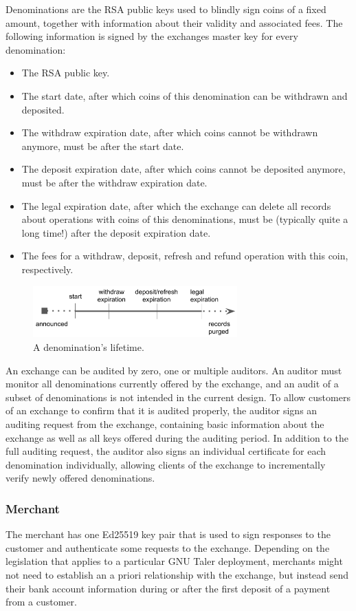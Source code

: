 Denominations are the RSA public keys used to blindly sign coins of a fixed amount, together with information about their
validity and associated fees.  The following information is signed by the exchanges master key for every denomination:
\begin{itemize}
  \item The RSA public key.
  \item The start date, after which coins of this denomination can be withdrawn and deposited.
  \item The withdraw expiration date, after which coins cannot be withdrawn anymore, must be after the start date.
  \item The deposit expiration date, after which coins cannot be deposited anymore, must be after the withdraw expiration date.
  \item The legal expiration date, after which the exchange can delete all records about operations with coins of this denominations,
    must be (typically quite a long time!) after the deposit expiration date.
  \item The fees for a withdraw, deposit, refresh and refund operation with this coin, respectively.
\end{itemize}

\begin{figure}
    \centering
    \includegraphics[width=0.7\textwidth]{diagrams/taler-diagram-denom-expiration.png}
    \caption{A denomination's lifetime.}
\end{figure}

An exchange can be audited by zero, one or multiple auditors.  An auditor must
monitor all denominations currently offered by the exchange, and an audit of a
subset of denominations is not intended in the current design.  To allow
customers of an exchange to confirm that it is audited properly, the auditor
signs an auditing request from the exchange, containing basic information about
the exchange as well as all keys offered during the auditing period.  In
addition to the full auditing request, the auditor also signs an individual
certificate for each denomination individually, allowing clients of the
exchange to incrementally verify newly offered denominations.

\subsubsection{Merchant}
The merchant has one Ed25519 key pair that is used to sign responses to the
customer and authenticate some requests to the exchange.  Depending on the
legislation that applies to a particular GNU Taler deployment, merchants might
not need to establish an a priori relationship with the exchange, but instead
send their bank account information during or after the first deposit of a
payment from a customer.

